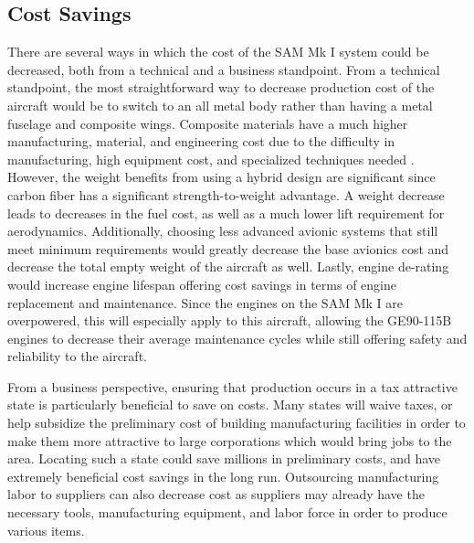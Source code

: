 \subsection{Cost Savings}

There are several ways in which the cost of the SAM Mk I system could be decreased, both from a technical and a business standpoint. From a technical standpoint, the most straightforward way to decrease production cost of the aircraft would be to switch to an all metal body rather than having a metal fuselage and composite wings. Composite materials have a much higher manufacturing, material, and engineering cost due to the difficulty in manufacturing, high equipment cost, and specialized techniques needed \cite{compositecost}. However, the weight benefits from using a hybrid design are significant since carbon fiber has a significant strength-to-weight advantage. A weight decrease leads to decreases in the fuel cost, as well as a much lower lift requirement for aerodynamics. Additionally, choosing less advanced avionic systems that still meet minimum requirements would greatly decrease the base avionics cost and decrease the total empty weight of the aircraft as well. Lastly, engine de-rating would increase engine lifespan offering cost savings in terms of engine replacement and maintenance. Since the engines on the SAM Mk I are overpowered, this will especially apply to this aircraft, allowing the GE90-115B engines to decrease their average maintenance cycles while still offering safety and reliability to the aircraft.

From a business perspective, ensuring that production occurs in a tax attractive state is particularly beneficial to save on costs. Many states will waive taxes, or help subsidize the preliminary cost of building manufacturing facilities in order to make them more attractive to large corporations which would bring jobs to the area. Locating such a state could save millions in preliminary costs, and have extremely beneficial cost savings in the long run. Outsourcing manufacturing labor to suppliers can also decrease cost as suppliers may already have the necessary tools, manufacturing equipment, and labor force in order to produce various items.





